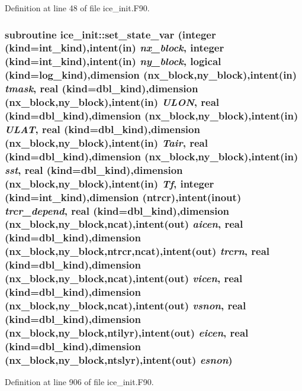 Definition at line 48 of file ice\_\-init.F90.\hypertarget{namespaceice__init_a4b7d50da13bea3bc9e8c7f2e042963ec}{
\subsubsection[{set\_\-state\_\-var}]{\setlength{\rightskip}{0pt plus 5cm}subroutine ice\_\-init::set\_\-state\_\-var (integer (kind=int\_\-kind),intent(in) {\em nx\_\-block}, \/  integer (kind=int\_\-kind),intent(in) {\em ny\_\-block}, \/  logical (kind=log\_\-kind),dimension (nx\_\-block,ny\_\-block),intent(in) {\em tmask}, \/  real (kind=dbl\_\-kind),dimension (nx\_\-block,ny\_\-block),intent(in) {\em ULON}, \/  real (kind=dbl\_\-kind),dimension (nx\_\-block,ny\_\-block),intent(in) {\em ULAT}, \/  real (kind=dbl\_\-kind),dimension (nx\_\-block,ny\_\-block),intent(in) {\em Tair}, \/  real (kind=dbl\_\-kind),dimension (nx\_\-block,ny\_\-block),intent(in) {\em sst}, \/  real (kind=dbl\_\-kind),dimension (nx\_\-block,ny\_\-block),intent(in) {\em Tf}, \/  integer (kind=int\_\-kind),dimension (ntrcr),intent(inout) {\em trcr\_\-depend}, \/  real (kind=dbl\_\-kind),dimension (nx\_\-block,ny\_\-block,ncat),intent(out) {\em aicen}, \/  real (kind=dbl\_\-kind),dimension (nx\_\-block,ny\_\-block,ntrcr,ncat),intent(out) {\em trcrn}, \/  real (kind=dbl\_\-kind),dimension (nx\_\-block,ny\_\-block,ncat),intent(out) {\em vicen}, \/  real (kind=dbl\_\-kind),dimension (nx\_\-block,ny\_\-block,ncat),intent(out) {\em vsnon}, \/  real (kind=dbl\_\-kind),dimension (nx\_\-block,ny\_\-block,ntilyr),intent(out) {\em eicen}, \/  real (kind=dbl\_\-kind),dimension (nx\_\-block,ny\_\-block,ntslyr),intent(out) {\em esnon})}}
\label{namespaceice__init_a4b7d50da13bea3bc9e8c7f2e042963ec}


Definition at line 906 of file ice\_\-init.F90.